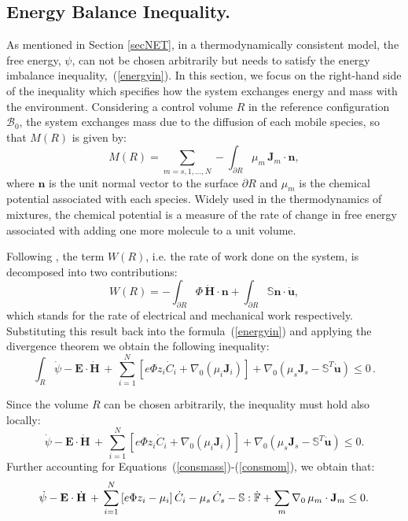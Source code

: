 \subsection{Energy Balance Inequality.}
\label{sec_ine}

As mentioned in Section \ref{secNET}, in a thermodynamically consistent model, the free energy, $\psi$, can not be chosen arbitrarily but needs to satisfy the energy imbalance inequality,~(\ref{energyin}). In this section, we focus on the right-hand side of the inequality which specifies how the system exchanges energy and mass with the environment. Considering a control volume $R$ in the reference configuration $\mathcal{B}_0$, the system exchanges mass due to the diffusion of each mobile species, so that $M(R)$ is given by:
\begin{equation}
M(R)= \sum\limits_{m=s,1,\ldots,N} - \int_{\partial R} \mu_m \,\mathbf{J}_m \cdot \mathbf{n} \label{M},
\end{equation}
where $\mathbf{n}$ is the unit normal vector to the surface $\partial R$ and $\mu_m$ is the chemical potential associated with each species. Widely used in the thermodynamics of mixtures, the chemical potential is a measure of the rate of change in free energy associated with adding one more molecule to a unit volume.

Following \cite{DROZDOVph}, the term $W(R)$, i.e. the rate of work done on the system, is decomposed into two contributions:
\begin{equation}
W(R) = -\int_{\partial R} \Phi\, \dot{\mathbf{H}}\cdot \mathbf{n} +  \int_{\partial R}\mathbb{S}\mathbf{n} \cdot \dot{\mathbf{u}},\label{W}
\end{equation}
which stands for the rate of electrical and mechanical work respectively. Substituting this result back into the formula~(\ref{energyin}) and applying the divergence theorem we obtain the following inequality:
\begin{equation}
\int_R \dot{\psi} - \mathbf{E}\cdot \dot{\mathbf{H}} \, + \, \sum\limits_{i=1}^{N} \left[e \Phi  z_i \dot{C}_i+ \nabla_0 \left(\mu_i \mathbf{J}_i \right)\right] + \nabla_0 (\mu_s \mathbf{J}_s-\mathbb{S}^T\mathbf{\dot{u}}) \leq 0\,. 
\end{equation}

Since the volume $R$ can be chosen arbitrarily, the inequality must hold also locally:
\begin{equation}
\dot{\psi} - \mathbf{E}\cdot \dot{\mathbf{H}} \, + \, \sum\limits_{i=1}^{N} \left[e \Phi  z_i \dot{C}_i+ \nabla_0 \left(\mu_i \mathbf{J}_i \right)\right] + \nabla_0 (\mu_s \mathbf{J}_s -\mathbb{S}^T\mathbf{\dot{u}}) \leq 0. 
\end{equation}
Further accounting for Equations~(\ref{consmass})-(\ref{consmom}), we obtain that:
\begin{equation}
\begin{aligned}
\dot{\psi} - \mathbf{E}\cdot \dot{\mathbf{H}} \, + \, \sum\limits_{i=1}^{N} \left[e \Phi  z_i - \mu_i\right] \dot{C}_i - \mu_s \,\dot{C}_s -\mathbb{S}:\dot{\mathbb{F}}+ \sum\limits_{m} \nabla_0 \, \mu_m \cdot \mathbf{J}_m \leq 0.
\end{aligned}
\label{temp2} 
\end{equation}

